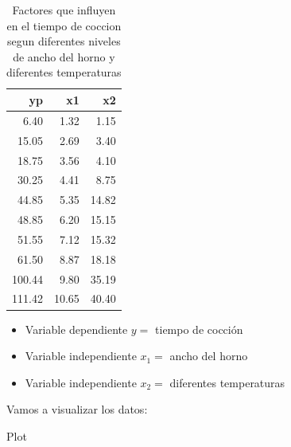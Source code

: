 \documentclass[
]{book}
\begin{document}
\begin{table}

\caption{\label{tab:rm41}Factores que influyen en el tiempo de coccion segun diferentes niveles de ancho del horno y diferentes temperaturas}
\centering
\begin{tabular}[t]{r|r|r}
\hline
yp & x1 & x2\\
\hline
6.40 & 1.32 & 1.15\\
\hline
15.05 & 2.69 & 3.40\\
\hline
18.75 & 3.56 & 4.10\\
\hline
30.25 & 4.41 & 8.75\\
\hline
44.85 & 5.35 & 14.82\\
\hline
48.85 & 6.20 & 15.15\\
\hline
51.55 & 7.12 & 15.32\\
\hline
61.50 & 8.87 & 18.18\\
\hline
100.44 & 9.80 & 35.19\\
\hline
111.42 & 10.65 & 40.40\\
\hline
\end{tabular}
\end{table}

\begin{itemize}
\item
  Variable dependiente \(y =\) tiempo de cocción
\item
  Variable independiente \(x_1 =\) ancho del horno
\item
  Variable independiente \(x_2 =\) diferentes temperaturas
\end{itemize}

Vamos a visualizar los datos:

Plot
\end{document}
